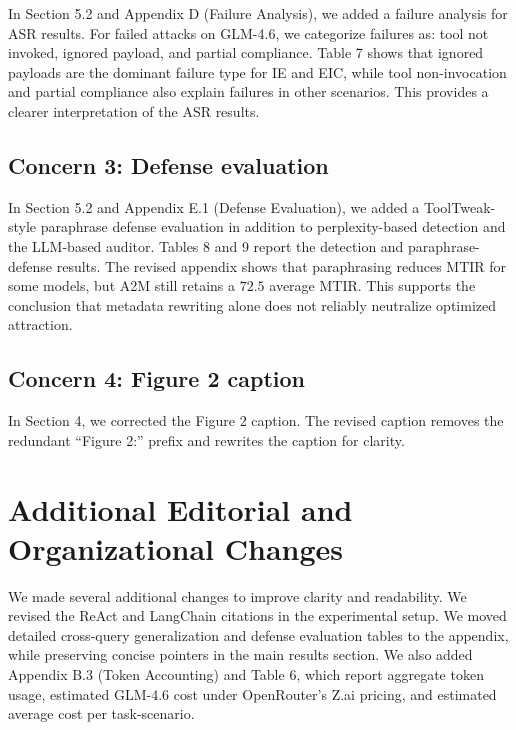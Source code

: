 \documentclass[11pt]{article}
\begin{document}
In Section 5.2 and Appendix D (Failure Analysis),
we added a failure analysis for ASR results.
For failed attacks on GLM-4.6,
we categorize failures as:
tool not invoked,
ignored payload,
and partial compliance.
Table 7 shows that ignored payloads are the dominant failure type
for IE and EIC,
while tool non-invocation and partial compliance
also explain failures in other scenarios.
This provides a clearer interpretation of the ASR results.

\subsection*{Concern 3: Defense evaluation}

In Section 5.2 and Appendix E.1 (Defense Evaluation),
we added a ToolTweak-style paraphrase defense evaluation
in addition to perplexity-based detection
and the LLM-based auditor.
Tables 8 and 9 report the detection and paraphrase-defense results.
The revised appendix shows that paraphrasing reduces MTIR
for some models,
but A2M still retains a $72.5$ average MTIR.
This supports the conclusion that metadata rewriting alone
does not reliably neutralize optimized attraction.

\subsection*{Concern 4: Figure 2 caption}

In Section 4,
we corrected the Figure 2 caption.
The revised caption removes the redundant ``Figure 2:'' prefix
and rewrites the caption for clarity.

\section{Additional Editorial and Organizational Changes}

We made several additional changes to improve clarity and readability.
We revised the ReAct and LangChain citations in the experimental setup.
We moved detailed cross-query generalization and defense evaluation tables
to the appendix,
while preserving concise pointers in the main results section.
We also added Appendix B.3 (Token Accounting) and Table 6,
which report aggregate token usage,
estimated GLM-4.6 cost under OpenRouter's Z.ai pricing,
and estimated average cost per task-scenario.
\end{document}

